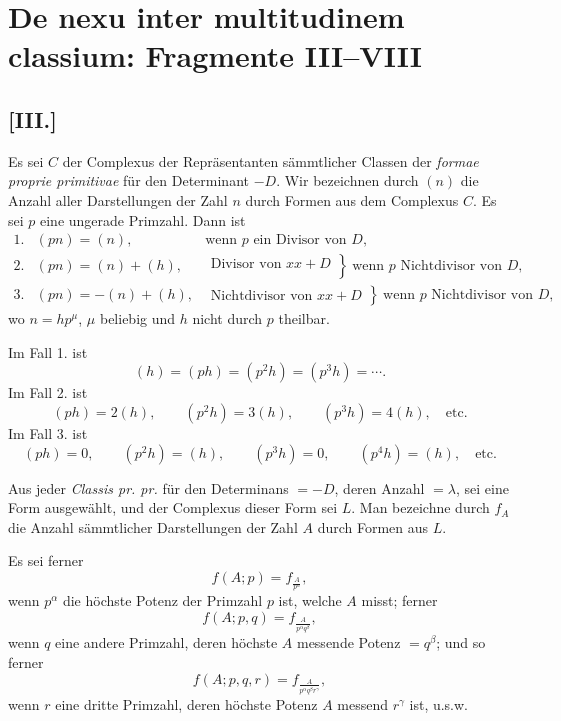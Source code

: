\documentclass[12pt]{article}
\begin{document}
\section*{De nexu inter multitudinem classium: Fragmente III--VIII}

\subsection*{[III.]}

Es sei $C$ der Complexus der Repräsentanten sämmtlicher Classen der \emph{formae proprie primitivae} für den Determinant $-D$. Wir bezeichnen durch $(n)$ die Anzahl aller Darstellungen der Zahl $n$ durch Formen aus dem Complexus $C$. Es sei $p$ eine ungerade Primzahl. Dann ist
\[
\begin{array}{rll}
1.&(pn)=(n),&\text{wenn }p\text{ ein Divisor von }D,\\[2mm]
2.&(pn)=(n)+(h),&
\left.
\begin{array}{l}
\text{Divisor von }xx+D\\
\end{array}
\right\}\ \text{wenn }p\text{ Nichtdivisor von }D,\\[3mm]
3.&(pn)=-(n)+(h),&
\left.
\begin{array}{l}
\text{Nichtdivisor von }xx+D
\end{array}
\right\}\ \text{wenn }p\text{ Nichtdivisor von }D,
\end{array}
\]
wo $n=hp^\mu$, $\mu$ beliebig und $h$ nicht durch $p$ theilbar.

Im Fall 1. ist
\[
(h)=(ph)=(p^2h)=(p^3h)=\cdots .
\]
Im Fall 2. ist
\[
(ph)=2(h),\qquad (p^2h)=3(h),\qquad (p^3h)=4(h),\quad\text{etc.}
\]
Im Fall 3. ist
\[
(ph)=0,\qquad (p^2h)=(h),\qquad (p^3h)=0,\qquad (p^4h)=(h),\quad\text{etc.}
\]

Aus jeder \emph{Classis pr. pr.} für den Determinans $=-D$, deren Anzahl $=\lambda$, sei eine Form ausgewählt, und der Complexus dieser Form sei $L$. Man bezeichne durch $f_A$ die Anzahl sämmtlicher Darstellungen der Zahl $A$ durch Formen aus $L$.

Es sei ferner
\[
f(A;p)=f_{\frac{A}{p^\alpha}},
\]
wenn $p^\alpha$ die höchste Potenz der Primzahl $p$ ist, welche $A$ misst; ferner
\[
f(A;p,q)=f_{\frac{A}{p^\alpha q^\beta}},
\]
wenn $q$ eine andere Primzahl, deren höchste $A$ messende Potenz $=q^\beta$; und so ferner
\[
f(A;p,q,r)=f_{\frac{A}{p^\alpha q^\beta r^\gamma}},
\]
wenn $r$ eine dritte Primzahl, deren höchste Potenz $A$ messend $r^\gamma$ ist, u.s.w.
\end{document}
